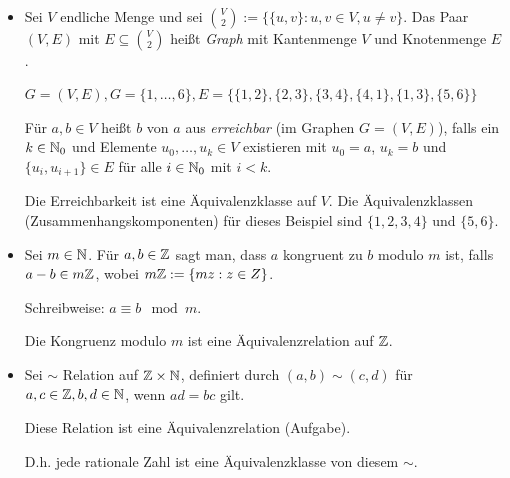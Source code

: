 \begin{bsp}\
\begin{itemize}
	\item Sei $ V $ endliche Menge und sei $ \binom{V}{2} := \{ \{ u,v \} : u,v \in V, u \neq v \} $. Das Paar $ (V,E) $ mit $ E \subseteq \binom{V}{2} $ heißt \emph{Graph} mit Kantenmenge $ V $ und Knotenmenge $ E $.
	
	$ G = (V,E), G = \{ 1,\ldots,6 \}, E = \{ \{ 1,2 \}, \{ 2,3 \}, \{ 3,4 \}, \{ 4,1 \}, \{ 1,3 \}, \{ 5,6 \} \} $
	
	Für $ a,b \in V $ heißt $ b $ von $ a $ aus \emph{erreichbar} (im Graphen $ G = (V,E) $), falls ein $ k \in \mathbb N_0 $ und Elemente $ u_0,\ldots,u_k \in V $ existieren mit $ u_0 = a $, $ u_k = b $ und $ \{ u_i,u_{i+1} \} \in E $ für alle $ i \in \mathbb N_0 $ mit $ i < k $.
	
	Die Erreichbarkeit ist eine Äquivalenzklasse auf $ V $.	Die Äquivalenzklassen (Zusammenhangskomponenten) für dieses Beispiel sind $ \{ 1,2,3,4 \} $ und $ \{ 5,6 \} $.
	
	\item Sei $ m \in \mathbb N $. Für $ a,b \in \mathbb Z $ sagt man, dass $ a $ kongruent zu $ b $ modulo $ m $ ist, falls $ a-b \in m\mathbb Z $, wobei $ m\mathbb Z := \{ mz : z \in Z \} $.
	
	Schreibweise: $ a \equiv b \mod{m} $.
	
	Die Kongruenz modulo $ m $ ist eine Äquivalenzrelation auf $ \mathbb Z $.
	
	\item Sei $ \sim $ Relation auf $ \mathbb Z \times \mathbb N $, definiert durch $ (a,b) \sim (c,d) $ für $ a,c \in \mathbb Z, b,d \in \mathbb N $, wenn $ ad = bc $ gilt.
	
	Diese Relation ist eine Äquivalenzrelation (Aufgabe).
	
	D.h. jede rationale Zahl ist eine Äquivalenzklasse von diesem $ \sim $.
\end{itemize}
\end{bsp}
